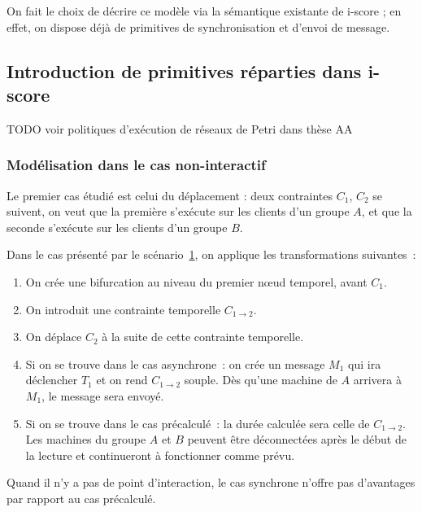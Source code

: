 \documentclass{article}
\newcommand\timenode{nœud temporel\xspace}
\begin{document}
On fait le choix de décrire ce modèle via la sémantique existante de i-score ; en effet, on dispose déjà de primitives de synchronisation et d'envoi de message.


\subsection{Introduction de primitives réparties dans i-score}
TODO voir politiques d'exécution de réseaux de Petri dans thèse AA

\subsubsection{Modélisation dans le cas non-interactif}
Le premier cas étudié est celui du déplacement : deux contraintes $C_1$, $C_2$ se suivent, on veut que la première s'exécute sur les clients d'un groupe $A$, et que la seconde s'exécute sur les clients d'un groupe $B$.
\begin{figure}[h]
    \centering
    \begin{tikzpicture}
    
    \end{tikzpicture}
    \label{scenar.simple}
\end{figure}

Dans le cas présenté par le scénario~\ref{scenar.simple}, on applique les transformations suivantes~: 
\begin{enumerate}
    \item On crée une bifurcation au niveau du premier \timenode, avant $C_1$.
    \item On introduit une contrainte temporelle $C_{1\rightarrow2}$.
    \item On déplace $C_2$ à la suite de cette contrainte temporelle.
    \item Si on se trouve dans le cas asynchrone~: on crée un message $M_1$ qui ira déclencher $T_1$ et on rend $C_{1\rightarrow2}$ souple.
    Dès qu'une machine de $A$ arrivera à $M_1$, le message sera envoyé.
    \item Si on se trouve dans le cas précalculé~: la durée calculée sera celle de $C_{1\rightarrow2}$. Les machines du groupe $A$ et $B$ peuvent être déconnectées après le début de la lecture et continueront à fonctionner comme prévu.
\end{enumerate}
Quand il n'y a pas de point d'interaction, le cas synchrone n'offre pas d'avantages par rapport au cas précalculé.
\end{document}
